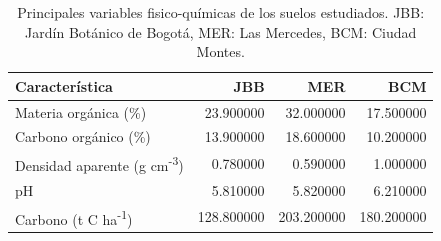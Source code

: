 \begin{table}
	\centering
\begin{tabular}{lrrr}
\toprule
Característica & JBB & MER & BCM \\
\midrule
Materia orgánica (\%) & 23.900000 & 32.000000 & 17.500000 \\
Carbono orgánico (\%) & 13.900000 & 18.600000 & 10.200000 \\
Densidad aparente (g cm\textsuperscript{-3}) & 0.780000 & 0.590000 & 1.000000 \\
pH & 5.810000 & 5.820000 & 6.210000 \\
Carbono (t C ha\textsuperscript{-1}) & 128.800000 & 203.200000 & 180.200000 \\
\bottomrule
\end{tabular}
\caption[Variables fisico-químicas]{Principales variables fisico-químicas de los suelos estudiados. JBB: Jardín Botánico de Bogotá, MER: Las Mercedes, BCM: Ciudad Montes.}
\label{sue_tab}
\end{table}
